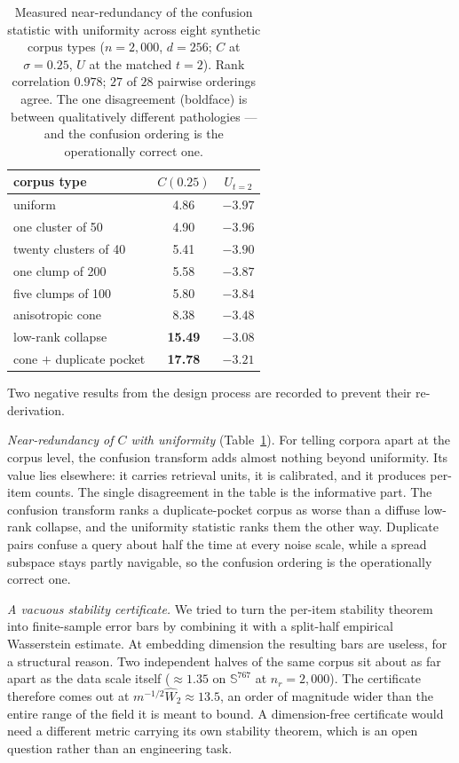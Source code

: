 \documentclass[11pt,letterpaper]{article}
\begin{document}
\begin{table}[t]
\centering
\caption{Measured near-redundancy of the confusion statistic with
uniformity across eight synthetic corpus types ($n = 2{,}000$, $d = 256$;
$C$ at $\sigma = 0.25$, $U$ at the matched $t = 2$). Rank correlation
$0.978$; $27$ of $28$ pairwise orderings agree. The one disagreement
(boldface) is between qualitatively different pathologies --- and the
confusion ordering is the operationally correct one.}
\label{tab:redundancy}
\small
\begin{tabular}{lcc}
\toprule
corpus type & $C(0.25)$ & $U_{t=2}$\\
\midrule
uniform & 4.86 & $-3.97$\\
one cluster of 50 & 4.90 & $-3.96$\\
twenty clusters of 40 & 5.41 & $-3.90$\\
one clump of 200 & 5.58 & $-3.87$\\
five clumps of 100 & 5.80 & $-3.84$\\
anisotropic cone & 8.38 & $-3.48$\\
low-rank collapse & \textbf{15.49} & $\mathbf{-3.08}$\\
cone $+$ duplicate pocket & \textbf{17.78} & $\mathbf{-3.21}$\\
\bottomrule
\end{tabular}
\end{table}

Two negative results from the design process are recorded to prevent
their re-derivation.

\emph{Near-redundancy of $C$ with uniformity}
(Table~\ref{tab:redundancy}). For telling corpora apart at the corpus
level, the confusion transform adds almost nothing beyond uniformity. Its
value lies elsewhere: it carries retrieval units, it is calibrated, and it
produces per-item counts. The single disagreement in the table is the
informative part. The confusion transform ranks a duplicate-pocket corpus
as worse than a diffuse low-rank collapse, and the uniformity statistic
ranks them the other way. Duplicate pairs confuse a query about half the
time at every noise scale, while a spread subspace stays partly navigable,
so the confusion ordering is the operationally correct one.

\emph{A vacuous stability certificate.} We tried to turn the per-item
stability theorem into finite-sample error bars by combining it with a
split-half empirical Wasserstein estimate. At embedding dimension the
resulting bars are useless, for a structural reason. Two independent
halves of the same corpus sit about as far apart as the data scale itself
($\approx 1.35$ on $\mathbb S^{767}$ at $n_r = 2{,}000$). The certificate
therefore comes out at $m^{-1/2}\widehat W_2 \approx 13.5$, an order of
magnitude wider than the entire range of the field it is meant to bound. A
dimension-free certificate would need a different metric carrying its own
stability theorem, which is an open question rather than an engineering
task.
\end{document}
